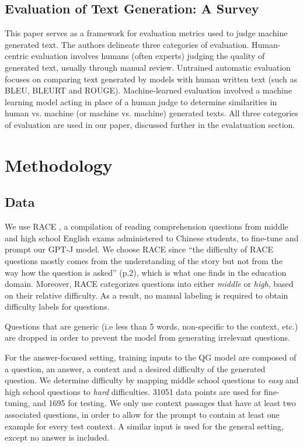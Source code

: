 \documentclass[11pt]{article}
\begin{document}
\subsection{Evaluation of Text Generation: A Survey}
This paper \citep{text-gen-survey:13} serves as a framework for evaluation metrics used to judge machine generated text. The authors delineate three categories of evaluation. Human-centric evaluation involves humans (often experts) judging the quality of generated text, usually through manual review. Untrained automatic evaluation focuses on comparing text generated by models with human written text (such as BLEU, BLEURT and ROUGE).  Machine-learned evaluation involved a machine learning model acting in place of a human judge to determine similarities in human vs. machine (or machine vs. machine) generated texts. All three categories of evaluation are used in our paper, discussed further in the evalatuation section.


\section{Methodology}

\subsection{Data}

We use RACE \citep{RACE:2}, a compilation of reading comprehension questions from middle and high school English exams administered to Chinese students, to fine-tune and prompt our GPT-J model. We choose RACE since ``the difficulty of RACE questions mostly comes from the understanding of the story but not from the way how the question is asked'' \citep{Difficulty:3} (p.2), which is what one finds in the education domain. Moreover, RACE categorizes questions into either \textit{middle} or \textit{high}, based on their relative difficulty. As a result, no manual labeling is required to obtain difficulty labels for questions.

Questions that are generic (i.e less than 5 words, non-specific to the context, etc.) are dropped in order to prevent the model from generating irrelevant questions.

For the answer-focused setting, training inputs to the QG model are composed of a question, an answer, a context and a desired difficulty of the generated question. We determine difficulty by mapping middle school questions to \textit{easy} and high school questions to \textit{hard} difficulties. 31051 data points are used for fine-tuning, and 1695 for testing. We only use context passages that have at least two associated questions, in order to allow for the prompt to contain at least one example for every test context. A similar input is used for the general setting, except no answer is included. 
\end{document}
